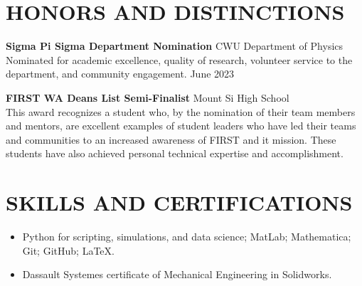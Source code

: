\documentclass[a4paper,9pt]{extarticle}
\begin{document}
\section*{HONORS AND DISTINCTIONS}
\textbf{Sigma Pi Sigma Department Nomination} \hfill CWU Department of Physics\\
Nominated for academic excellence, quality of research, volunteer service to the department, and community engagement. \hfill June 2023

\noindent\textbf{FIRST WA Deans List Semi-Finalist}  \hfill Mount Si High School\\
This award recognizes a student who, by the nomination of their team members and mentors, are excellent examples of student leaders who have led their teams and communities to an increased awareness of FIRST and it mission. These students have also achieved personal technical expertise and accomplishment.


\section*{SKILLS AND CERTIFICATIONS}
\begin{itemize}
    \item Python for scripting, simulations, and data science; MatLab; Mathematica; Git; GitHub; \LaTeX.
    \item Dassault Systemes certificate of Mechanical Engineering in Solidworks.
\end{itemize}
\end{document}
